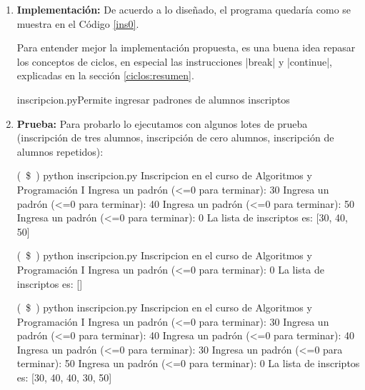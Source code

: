 \begin{enumerate}
\begin{itemize}
\begin{codigo-nohl-sn}
La lista de inscriptos es vacía
Repetir indefinidamente:
    Pedir padrón
    Si el padrón no es positivo:
        Salir del ciclo
	Agregar el padrón a la lista
Devolver la lista de inscriptos
\end{codigo-nohl-sn}

\end{itemize}

\item {\bf Implementación:}
De acuerdo a lo diseñado, el programa quedaría como
se muestra en el Código \ref{ins0}.

\begin{observacion}
Para entender mejor la implementación propuesta, es una buena idea repasar los
conceptos de ciclos, en especial las instrucciones |break| y |continue|,
explicadas en la sección \ref{ciclos:resumen}.
\end{observacion}

\begin{codigo}{inscripcion.py}{Permite ingresar padrones de alumnos
inscriptos}
\label{ins0}

\end{codigo}

\item {\bf Prueba:}
Para probarlo lo ejecutamos con algunos lotes de prueba (inscripción de
tres alumnos, inscripción de cero alumnos, inscripción de alumnos
repetidos):

\begin{codigo-nohl-sn}
(~\$~) python inscripcion.py
Inscripcion en el curso de Algoritmos y Programación I
Ingresa un padrón (<=0 para terminar): 30
Ingresa un padrón (<=0 para terminar): 40
Ingresa un padrón (<=0 para terminar): 50
Ingresa un padrón (<=0 para terminar): 0
La lista de inscriptos es: [30, 40, 50]

(~\$~) python inscripcion.py
Inscripcion en el curso de Algoritmos y Programación I
Ingresa un padrón (<=0 para terminar): 0
La lista de inscriptos es: []

(~\$~) python inscripcion.py
Inscripcion en el curso de Algoritmos y Programación I
Ingresa un padrón (<=0 para terminar): 30
Ingresa un padrón (<=0 para terminar): 40
Ingresa un padrón (<=0 para terminar): 40
Ingresa un padrón (<=0 para terminar): 30
Ingresa un padrón (<=0 para terminar): 50
Ingresa un padrón (<=0 para terminar): 0
La lista de inscriptos es: [30, 40, 40, 30, 50]
\end{codigo-nohl-sn}


\end{enumerate}
